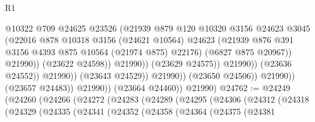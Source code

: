 \begin{lexlean}{R1}
\begin{coremodule}
                                              @10322
                                              @709
                                              @24625
                                              @23526
                                              (@21939
                                                @879
                                                @120
                                                @10320
                                                @3156
                                                @24623
                                                @3045
                                                (@22016
                                                  @878
                                                  @10318
                                                  @3156
                                                  (@24621 @10564)
                                                  @24623
                                                  (@21939
                                                    @876
                                                    @391
                                                    @3156
                                                    @4393
                                                    @875
                                                    @10564
                                                    (@21974 @875)
                                                    @22176)
                                                  (@6827 @875 @20967))
                                                @21990))
                                            (@23622 @24598))
                                          @21990))
                                      (@23629 @24575))
                                    @21990))
                                (@23636 @24552))
                              @21990))
                          (@23643 @24529))
                        @21990))
                    (@23650 @24506))
                  @21990))
              (@23657 @24483))
            @21990))
        (@23664 @24460))
      @21990)
@24762 := @24249
    (@24260
      (@24266
        (@24272
          (@24283
            (@24289
              (@24295
                (@24306
                  (@24312
                    (@24318
                      (@24329
                        (@24335
                          (@24341
                            (@24352
                              (@24358
                                (@24364
                                  (@24375
                                    (@24381

\end{coremodule}
\end{lexlean}
